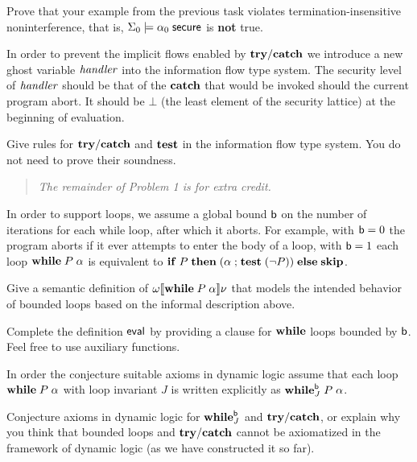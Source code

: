 \documentclass[11pt]{article}
\begin{document}
\begin{task}[10 points]\rm
  Prove that your example from the previous task violates
  termination-insensitive noninterference, that is,
  $\Sigma_0 \models \alpha_0\; \mathsf{secure}$ is \textbf{not} true.
\end{task}

In order to prevent the implicit flows enabled by $\mathbf{try/catch}$ we introduce a new
ghost variable $\mathit{handler}$ into the information flow type system.  The
security level of $\mathit{handler}$ should be that of the $\mathbf{catch}$ that would
be invoked should the current program abort.  It should be $\bot$ (the least
element of the security lattice) at the beginning of evaluation.

\begin{task}[10 points]\rm
  Give rules for $\mathbf{try/catch}$ and $\mathbf{test}$ in the information flow type
  system.  You do not need to prove their soundness.
\end{task}

\begin{quote}\it
  \color{red}The remainder of Problem 1 is for extra credit.
\end{quote}

\noindent
In order to support loops, we assume a global bound $\mathsf{b}$ on the number of
iterations for each while loop, after which it aborts.  For example, with
$\mathsf{b} = 0$ the program aborts if it ever attempts to enter the body of a loop,
with $\mathsf{b} = 1$ each loop $\mathbf{while}\; P\; \alpha$ is equivalent to
$\mathbf{if}\; P\; \mathbf{then}\; (\alpha \mathrel{;} \mathbf{test}\; (\lnot P)) \; \mathbf{else}\;
\mathbf{skip}$.

\begin{task}\rm
  Give a semantic definition of $\omega \llbracket \mathbf{while}\; P\; \alpha\rrbracket \nu$
  that models the intended behavior of bounded loops based on the informal
  description above.
\end{task}

\begin{task}\rm
  Complete the definition $\mathsf{eval}$ by providing a clause for $\mathbf{while}$ loops
  bounded by $\mathsf{b}$.  Feel free to use auxiliary functions.
\end{task}

In order the conjecture suitable axioms in dynamic logic assume that each loop
$\mathbf{while}\; P\; \alpha$ with loop invariant $J$ is written explicitly as
$\mathbf{while}_J^{\mathsf{b}}\; P\; \alpha$.

\begin{task}\rm
  Conjecture axioms in dynamic logic for $\mathbf{while}^{\mathsf{b}}_J$ and
  $\mathbf{try/catch}$, or explain why you think that bounded loops and $\mathbf{try/catch}$
  cannot be axiomatized in the framework of dynamic logic (as we have
  constructed it so far).
\end{task}
\end{document}
